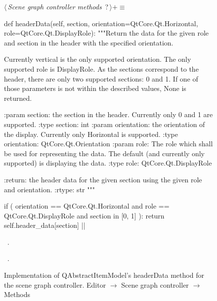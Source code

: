 \documentclass[%
    a4paper,    %
    justified,  %
    nobib,      %
    openany     %
]{tufte-book}
\makeatletter
\renewcommand{\label}[1]{\@tufte@label{##1}}%
\makeatother
\begin{document}
\begin{figure}
\begin{flushleft} \small
\begin{minipage}{\linewidth}\label{scrap36}\raggedright\small
{} $\langle\,${\itshape Scene graph controller methods}\nobreak\ {\footnotesize {?}}$\,\rangle+\equiv$
\vspace{-1ex}
\begin{pythoncode}
def headerData(self, section, orientation=QtCore.Qt.Horizontal,
               role=QtCore.Qt.DisplayRole):
    """Return the data for the given role and section in the
    header with the specified orientation.

    Currently vertical is the only supported orientation. The
    only supported role is DisplayRole. As the sections correspond
    to the header, there are only two supported sections: 0 and 1.
    If one of those parameters is not within the described values,
    None is returned.

    :param section: the section in the header. Currently only 0
                    and 1 are supported.
    :type  section: int
    :param orientation: the orientation of the display. Currently
                        only Horizontal is supported.
    :type orientation:  QtCore.Qt.Orientation
    :param role: The role which shall be used for representing
                 the data. The default (and currently only
                supported) is displaying the data.
    :type role:  QtCore.Qt.DisplayRole

    :return: the header data for the given section using the
             given role and orientation.
    :rtype:  str
    """

    if (
            orientation == QtCore.Qt.Horizontal  and
            role        == QtCore.Qt.DisplayRole and
            section     in [0, 1]
    ):
        return self.header_data[section]
|\NWsep|
\end{pythoncode}
\vspace{1.5ex}
\footnotesize
\begin{list}{}{\setlength{\itemsep}{-\parsep}\setlength{\itemindent}{-\leftmargin}}
\item \NWtxtMacroDefBy\ .
\item \NWtxtMacroRefIn\ .

\item{}
\end{list}
\end{minipage}\vspace{4ex}
\end{flushleft}
\caption{Implementation of QAbstractItemModel's headerData method for the scene
  graph controller.
  \newline{}\newline{}Editor $\rightarrow$ Scene graph controller $\rightarrow$
  Methods}
\label{editor:lst:scene-graph-controller:methods:header-data}
\end{figure}
\end{document}
